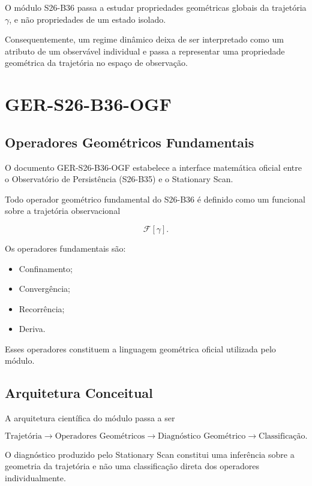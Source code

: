 \documentclass[11pt,a4paper]{article}
\begin{document}
O módulo S26-B36 passa a estudar propriedades geométricas globais da trajetória
\(\gamma\), e não propriedades de um estado isolado.

Consequentemente, um regime dinâmico deixa de ser interpretado como um atributo de um
observável individual e passa a representar uma propriedade geométrica da trajetória no
espaço de observação.

\section{GER-S26-B36-OGF}

\subsection{Operadores Geométricos Fundamentais}

O documento GER-S26-B36-OGF estabelece a interface matemática oficial entre o
Observatório de Persistência (S26-B35) e o Stationary Scan.

Todo operador geométrico fundamental do S26-B36 é definido como um funcional sobre a
trajetória observacional

\[
\mathcal F[\gamma].
\]

Os operadores fundamentais são:

\begin{itemize}
\item Confinamento;
\item Convergência;
\item Recorrência;
\item Deriva.
\end{itemize}

Esses operadores constituem a linguagem geométrica oficial utilizada pelo módulo.

\subsection{Arquitetura Conceitual}

A arquitetura científica do módulo passa a ser

\[
\text{Trajetória}
\longrightarrow
\text{Operadores Geométricos}
\longrightarrow
\text{Diagnóstico Geométrico}
\longrightarrow
\text{Classificação}.
\]

O diagnóstico produzido pelo Stationary Scan constitui uma inferência sobre a geometria da
trajetória e não uma classificação direta dos operadores individualmente.
\end{document}
